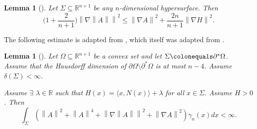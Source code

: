 \documentclass[12pt,reqno]{amsart}
\newtheorem{lemma}[theorem]{Lemma}
\theoremstyle{definition}
\renewcommand{\subset}{\subseteq}
\newcommand{\vnormt}[1]{\left\|#1\right\|}    %
\newcommand{\R}{\mathbb{R}}
\newcommand{\redA}{\partial^{*}\Omega}
\newcommand{\sdimn}{n}
\newcommand{\adimn}{n+1}
\newcommand{\scon}{\lambda}
\newcommand{\pcon}{\delta}
\begin{document}
\begin{lemma}[{\cite[Lemma 10.2]{colding12a}}]\label{lemma39.9}
Let $\Sigma\subset\R^{\adimn}$ be any $\sdimn$-dimensional hypersurface.  Then
\begin{equation}\label{two12}
\Big(1+\frac{2}{\adimn}\Big)\vnormt{\nabla\vnormt{A}}^{2}
\leq \vnormt{\nabla A}^{2}+\frac{2\sdimn}{\adimn}\vnormt{\nabla H}^{2}.
\end{equation}
\end{lemma}




The following estimate is adapted from \cite{colding12a}, which itself was adapted from \cite{schoen75}.

\begin{lemma}[{\cite[Proposition 10.14]{colding12a}}]\label{lemma39.2}
Let $\Omega\subset\R^{\adimn}$ be a convex set and let $\Sigma\colonequals\redA$.  Assume that the Hausdorff dimension of $\partial\Omega\setminus\redA$ is at most $n-4$.  Assume $\pcon(\Sigma)<\infty$.

Assume $\exists$ $\scon\in\R$ such that $H(x)=\langle x,N(x)\rangle+\scon$ for all $x\in\Sigma$.  Assume $H>0$.  Then
$$\int_{\Sigma}(\vnormt{A}^{2}+\vnormt{A}^{4}+\vnormt{\nabla\vnormt{A}}^{2}+\vnormt{\nabla A}^{2})\gamma_{\sdimn}(x)dx<\infty.$$
\end{lemma}
\end{document}
